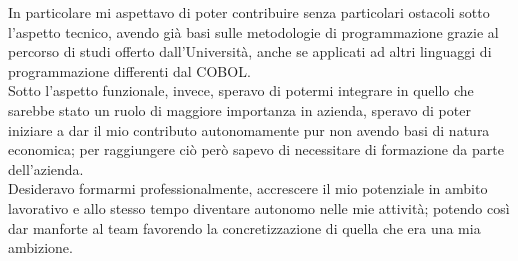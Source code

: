 	In particolare mi aspettavo di poter contribuire senza particolari ostacoli sotto l'aspetto tecnico, avendo già basi sulle metodologie di programmazione grazie al percorso di studi offerto dall'Università, anche se applicati ad altri linguaggi di programmazione differenti dal COBOL.\\
	
	Sotto l'aspetto funzionale, invece, speravo di potermi integrare in quello che sarebbe stato un ruolo di maggiore importanza in azienda, speravo di poter iniziare a dar il mio contributo autonomamente pur non avendo basi di natura economica; per raggiungere ciò però sapevo di necessitare di formazione da parte dell'azienda.\\
	
	Desideravo formarmi professionalmente, accrescere il mio potenziale in ambito lavorativo e allo stesso tempo diventare autonomo nelle mie attività; potendo così dar manforte al team favorendo la concretizzazione di quella che era una mia ambizione.